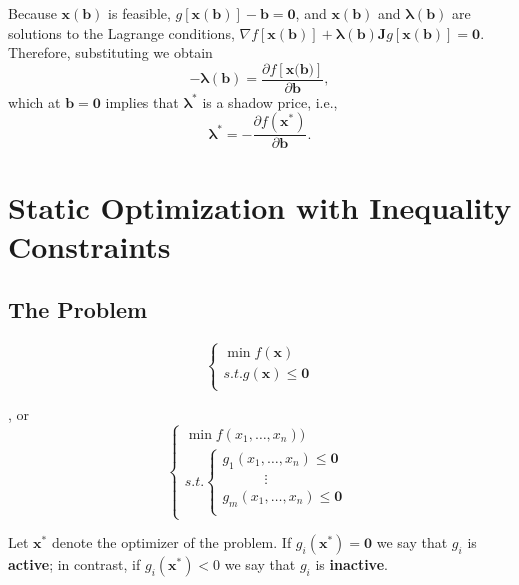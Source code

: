 Because $\mathbf{x(b)}$ is feasible, $g[\mathbf{x\boldsymbol{(\mathbf{b})}}]-\mathbf{b = 0}$, and $\mathbf{x(b)}$ and $\boldsymbol{\lambda(\mathbf{b})}$ are solutions to the Lagrange conditions, $\nabla f[\mathbf{x \boldsymbol{(\mathbf{b})}}] + \boldsymbol{\lambda(\mathbf{b})}\mathbf{J}g[\mathbf{x\boldsymbol{(\mathbf{b})}}] = \mathbf{0}$. Therefore, substituting we obtain \[
    -\boldsymbol{\lambda(\mathbf{b})} = \frac{\partial f[\mathbf{x\boldsymbol({\mathbf{b}})}]}{\partial \mathbf{b}},
\]
which at $\mathbf{b = 0}$ implies that $\boldsymbol{\lambda ^{*}}$ is a shadow price, i.e., \[
    \boldsymbol{\lambda ^{*}} = - \frac{\partial f(\mathbf{x ^{*}})}{\partial \mathbf{b}}.
\]


\section{Static Optimization with Inequality Constraints}

\subsection{The Problem}
\[
    \left\{\begin{array}{l}
        \min f(\mathbf{x})                 \\
        s.t. g(\mathbf{x}) \leq \mathbf{0} \\
    \end{array}\right.
\]

, or \[
    \left\{\begin{array}{l}
        \min f(x_1,\dots,x_n)) \\
        s.t. \left\{\begin{array}{l}
                        g_1(x_1, \dots, x_n) \leq \mathbf{0} \\
                        \qquad \quad \vdots                  \\
                        g_m(x_1, \dots, x_n) \leq \mathbf{0} \\
                    \end{array}\right.
    \end{array}\right.
\]


\begin{definition}
    Let $\mathbf{x ^{*}}$ denote the optimizer of the problem. If $g_i(\mathbf{x ^{*}}) = \mathbf{0}$ we say that $g_i$ is \textbf{active}; in contrast, if $g_i(\mathbf{x ^{*}}) < 0$ we say that $g_i$ is \textbf{inactive}.
\end{definition}


